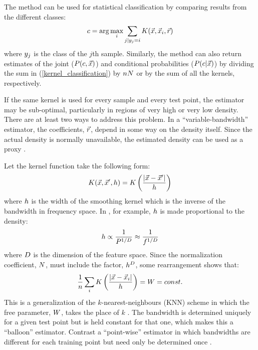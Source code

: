 \documentclass{article}
\newenvironment{eqnnon}{\begin{equation*}}{\end{equation*}}
\begin{document}
The method can be used for statistical classification by comparing
results from the different classes:
\begin{equation}
	c = \arg \max_i \sum_{j|y_j = i} K(\vec {x}, \vec {x}_i, \vec r)
	\label{kernel_classification}
\end{equation}
where $y_j$ is the class of the $j$th sample.
Similarly, the method can also return estimates of
the joint ($P(c, \vec x)$) and conditional probabilities 
($P(c |\vec x)$)
by dividing the sum in (\ref{kernel_classification})
by $n N$ or by the sum of all the kernels, respectively. 

If the same kernel is used for every sample and every test point, the estimator
may be sub-optimal, particularly in regions of very high or very low density.
There are at least two ways to address this problem.
In a ``variable-bandwidth'' estimator, the coefficients, $\vec r$, depend in some
way on the density itself. 
Since the actual density is normally unavailable, the
estimated density can be used as a proxy
\citep{Terrell_Scott1992,Mills2011}.

Let the kernel function take the following form:
\begin{eqnnon}
	\vectorkernel(\point, \point^\prime, \bandwidth) = \scalarkernel \left (\frac{|\point - \point^\prime|}{\bandwidth} \right )
	\label{scalar_kernel_def}
\end{eqnnon}
where $h$ is the width of the smoothing kernel
which is the inverse of the bandwidth in frequency space.
In \citet{Mills2011}, for example, 
$h$ is made proportional to the density:
\begin{eqnnon}
	\bandwidth \propto \frac{1}{\probability^{1/\dimension}} \approx \frac{1}{\densityestimator^{1/\dimension}}
	\label{setting_the_bandwidth}
\end{eqnnon}
where $D$ is the dimension of the feature space.
Since the normalization coefficient, $N$, must include the factor,
${h^D}$, some rearrangement shows that:
\begin{eqnnon}
	\frac{1}{\nsample} \sum_i \scalarkernel \left (\frac{|\testpoint - \sample_i|}{\bandwidth} \right ) = \kernelsum = const.
	\label{agf_def}
\end{eqnnon}
This is a generalization of the $k$-nearest-neighbours (KNN) scheme in which the
free parameter, $W$, takes the place of $k$ \citep{Mills2009,Mills2011}.
The bandwidth is determined uniquely for a given test point but is held constant for that
one, which makes this a ``balloon'' estimator. 
Contrast a ``point-wise'' estimator
in which bandwidths are different for each training point but need only be determined once
\citep{Terrell_Scott1992}.
\end{document}
